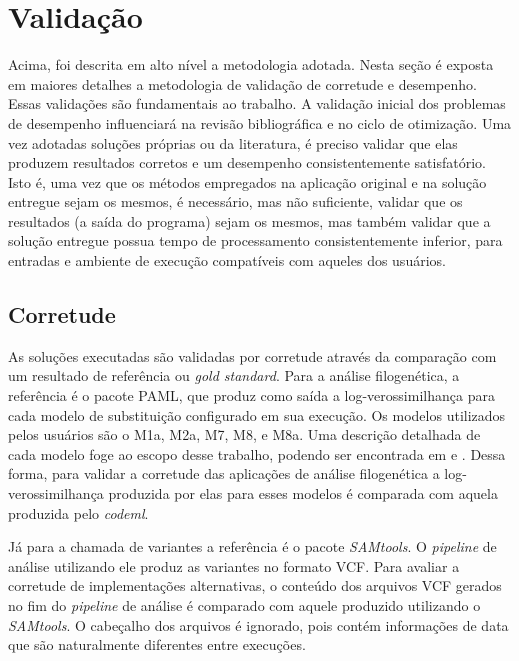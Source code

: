 \documentclass[cic,tc]{iiufrgs}
\begin{document}
\section{Validação}
\label{sec:test}

Acima, foi descrita em alto nível a metodologia adotada. Nesta seção é exposta
em maiores detalhes a metodologia de validação de corretude e desempenho. Essas
validações são fundamentais ao trabalho. A validação inicial dos problemas de
desempenho influenciará na revisão bibliográfica e no ciclo de otimização. Uma vez
adotadas soluções próprias ou da literatura, é preciso validar que elas
produzem resultados corretos e um desempenho consistentemente satisfatório.
Isto é, uma vez que os métodos empregados na aplicação original e na solução
entregue sejam os mesmos, é necessário, mas não suficiente, validar que os
resultados (a saída do programa) sejam os mesmos, mas também validar que a
solução entregue possua tempo de processamento consistentemente inferior, para
entradas e ambiente de execução compatíveis com aqueles dos usuários.

\subsection{Corretude}

As soluções executadas são validadas por corretude através da comparação com um
resultado de referência ou \textit{gold standard}. Para a análise filogenética,
a referência é o pacote PAML, que produz como saída a log-verossimilhança para
cada modelo de substituição configurado em sua execução. Os modelos utilizados
pelos usuários são o M1a, M2a, M7, M8, e M8a. Uma descrição detalhada de cada
modelo foge ao escopo desse trabalho, podendo ser encontrada em
\cite{yang2000codon} e \cite{zhang2005evaluation}. Dessa forma, para validar a
corretude das aplicações de análise filogenética a log-verossimilhança
produzida por elas para esses modelos é comparada com aquela produzida pelo
\textit{codeml}.

Já para a chamada de variantes a referência é o pacote \textit{SAMtools}. O
\textit{pipeline} de análise utilizando ele produz as variantes no formato VCF.
Para avaliar a corretude de implementações alternativas, o conteúdo dos
arquivos VCF gerados no fim do \textit{pipeline} de análise é comparado com
aquele produzido utilizando o \textit{SAMtools}. O cabeçalho dos arquivos é
ignorado, pois contém informações de data que são naturalmente diferentes entre
execuções.
\end{document}
